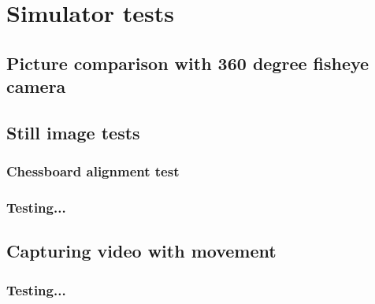 
\chapter{Simulator tests}

\section{Picture comparison with 360 degree fisheye camera}

\section{Still image tests}

\subsection{Chessboard alignment test}

\subsection{Testing...}

\section{Capturing video with movement}

\subsection{Testing...}
